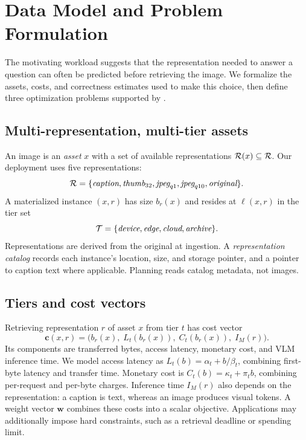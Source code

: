 \section{Data Model and Problem Formulation}
\label{sec:model}

The motivating workload suggests that the representation needed to answer a
question can often be predicted before retrieving the image. We formalize the
assets, costs, and correctness estimates used to make this choice, then define
three optimization problems supported by \system.

\subsection{Multi-representation, multi-tier assets}

An image is an \emph{asset} $x$ with a set of available representations
$\mathcal{R}(x)\subseteq\mathcal{R}$. Our deployment uses five representations:
\[
\mathcal{R}=\{\textit{caption},\textit{thumb}_{32},\textit{jpeg}_{q1},
\textit{jpeg}_{q10},\textit{original}\}.
\]
A materialized instance $(x,r)$ has size $b_r(x)$ and resides at
$\ell(x,r)$ in the tier set
\[
\mathcal{T}=\{\textit{device},\textit{edge},\textit{cloud},\textit{archive}\}.
\]
Representations are derived from the original at ingestion. A
\emph{representation catalog} records each instance's location, size, and
storage pointer, and a pointer to caption text where applicable.
Planning reads catalog metadata, not images.

\subsection{Tiers and cost vectors}

Retrieving representation $r$ of asset $x$ from tier $t$ has cost vector
\[
\mathbf{c}(x,r)=
\big(b_r(x),\;L_t(b_r(x)),\;C_t(b_r(x)),\;I_M(r)\big).
\]
Its components are transferred bytes, access latency, monetary cost, and VLM
inference time. We model access latency as $L_t(b)=\alpha_t+b/\beta_t$,
combining first-byte latency and transfer time. Monetary cost is
$C_t(b)=\kappa_t+\pi_t b$, combining per-request and per-byte charges.
Inference time $I_M(r)$ also depends on the representation: a caption is text,
whereas an image produces visual tokens. A weight vector $\mathbf{w}$ combines
these costs into a scalar objective. Applications may additionally impose hard
constraints, such as a retrieval deadline or spending limit.

